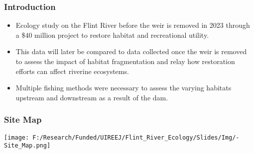 \documentclass[10pt]{beamer}
\newcommand{\iast}{\item[$\circledast$]}
\begin{document}


\begin{frame}
    \frametitle{Introduction} %
    \begin{itemize}
        \iast Ecology study on the Flint River before the weir is removed in 2023 through a \$40 million project to restore habitat and recreational utility. \vspace{2.5mm} %
        \iast This data will later be compared to data collected once the weir is removed to assess the impact of habitat fragmentation and relay how restoration efforts can affect riverine ecosystems. \vspace{2.5mm} %
        \iast Multiple fishing methods were necessary to assess the varying habitats upstream and downstream as a result of the dam.
    \end{itemize}
\end{frame}



\begin{frame}
    \frametitle{Site Map} %
    \centering
    \texttt{[image: F:/Research/Funded/UIREEJ/Flint\_River\_Ecology/Slides/Img/-Site\_Map.png]} \\
\end{frame}

\end{document}
